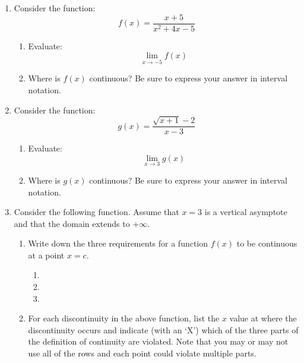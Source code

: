 \documentclass[letterpaper,12pt,fleqn]{article}
\begin{document}
\begin{enumerate}[left=0pt]
\item Consider the function:
  \[f(x)=\frac{x+5}{x^2+4x-5}\]
  \begin{enumerate}
  \item Evaluate:
    \[\lim_{x\to-5}f(x)\]
  \item Where is \(f(x)\) continuous?  Be sure to express your answer in interval notation.
  \end{enumerate}

  \bigskip

\item Consider the function:
  \[g(x)=\frac{\sqrt{x+1}-2}{x-3}\]
  \begin{enumerate}
  \item Evaluate:
    \[\lim_{x\to3}g(x)\]
  \item Where is \(g(x)\) continuous?  Be sure to express your answer in interval notation.
  \end{enumerate}

  \newpage

\item Consider the following function.  Assume that \(x=3\) is a vertical asymptote and that the domain extends to
  \(+\infty\).


  \begin{enumerate}
  \item Write down the three requirements for a function \(f(x)\) to be continuous at a point \(x=c\).
    \begin{enumerate}[label={\arabic*)}]
    \item
    \item
    \item
    \end{enumerate}
  \item For each discontinuity in the above function, list the \(x\) value at where the discontinuity occurs and indicate
    (with an `X') which of the three parts of the definition of continuity are violated.  Note that you may or may not use all
    of the rows and each point could violate multiple parts.


\end{enumerate}
\end{enumerate}
\end{document}
